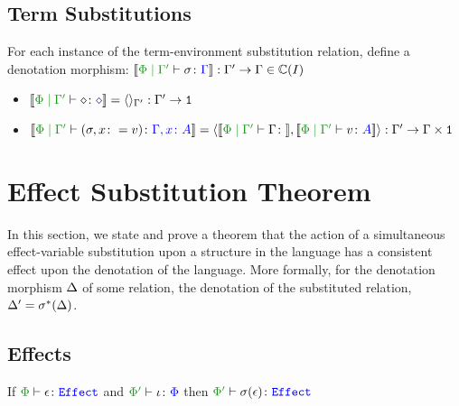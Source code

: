 \documentclass{report}
\begin{document}
\section{Term Substitutions}
For each instance of the term-environment substitution relation, define a denotation morphism: $\deno{\etyperelation{\P}{\G'}{\si}{\G}}: \G' \rightarrow \G \in \C(I)$

\begin{itemize}
    \item $\deno{\etyperelation{\P}{\G'}{\nil}{\nil}} = \term{\G'}: \G' \rightarrow \1$
    \item $\deno{\etyperelation{\P}{\G'}{(\si, x \setto v)}{\gax}} = \pr{\deno{\etyperelation{\P}{\G'}{\G}}}{\deno{\etyperelation{\P}{\G'}{v}{A}}}: \G' \rightarrow \G\times \1$
\end{itemize}

\chapter{Effect Substitution Theorem}
In this section, we state and prove a theorem that the action of a simultaneous effect-variable substitution upon a structure in the language has a consistent effect upon the denotation of the language. More formally, for the denotation morphism $\Delta$ of some relation, the denotation of the substituted relation, $\Delta' = \sigma^*(\Delta)$.


\section{Effects}

\begin{theorem}
    If $\wellformede{\P}{\e}$ and $\typerelation{\P'}{\i}{\P}$ then $\wellformede{\P'}{\si(\e)}$   
\end{theorem}
\end{document}
